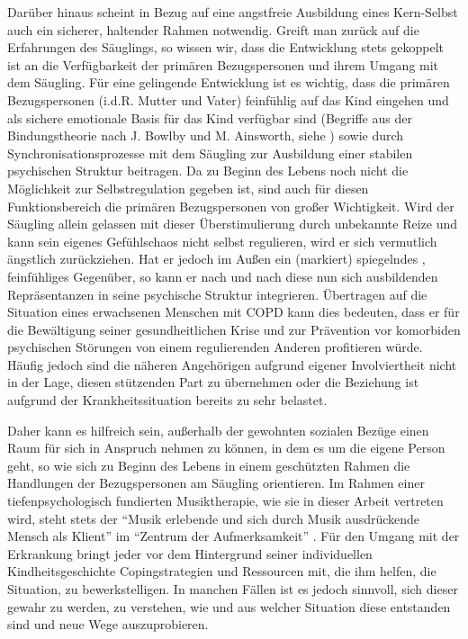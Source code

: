 Darüber hinaus scheint in Bezug auf eine angstfreie Ausbildung eines Kern-Selbst auch ein sicherer, haltender Rahmen notwendig. Greift man zurück auf die Erfahrungen des Säuglings, so wissen wir, dass die Entwicklung stets gekoppelt ist an die Verfügbarkeit der primären Bezugspersonen und ihrem Umgang mit dem Säugling. Für eine gelingende Entwicklung ist es wichtig, dass die primären Bezugspersonen (i.d.R. Mutter und Vater) feinfühlig auf das Kind eingehen und als sichere emotionale Basis für das Kind verfügbar sind (Begriffe aus der Bindungstheorie nach J. Bowlby und M. Ainsworth, siehe \cite{brisch2013}) sowie durch Synchronisationsprozesse mit dem Säugling zur Ausbildung einer stabilen psychischen Struktur beitragen. Da zu Beginn des Lebens noch nicht die Möglichkeit zur Selbstregulation gegeben ist, sind auch für diesen Funktionsbereich die primären Bezugspersonen von großer Wichtigkeit. Wird der Säugling allein gelassen mit dieser Überstimulierung durch unbekannte Reize und kann sein eigenes Gefühlschaos nicht selbst regulieren, wird er sich vermutlich ängstlich zurückziehen. Hat er jedoch im Außen ein (markiert) spiegelndes \autocite[vgl.][153]{fonagy2004}, feinfühliges Gegenüber, so kann er nach und nach diese nun sich ausbildenden Repräsentanzen in seine psychische Struktur integrieren. 
Übertragen auf die Situation eines erwachsenen Menschen mit COPD kann dies bedeuten, dass er für die Bewältigung seiner gesundheitlichen Krise und zur Prävention vor komorbiden psychischen Störungen von einem regulierenden Anderen profitieren würde. Häufig jedoch sind die näheren Angehörigen aufgrund eigener Involviertheit nicht in der Lage, diesen stützenden Part zu übernehmen oder die Beziehung ist aufgrund der Krankheitssituation bereits zu sehr belastet. 

Daher kann es hilfreich sein, außerhalb der gewohnten sozialen Bezüge einen Raum für sich in Anspruch nehmen zu können, in dem es um die eigene Person geht, so wie sich zu Beginn des Lebens in einem geschützten Rahmen die Handlungen der Bezugspersonen am Säugling orientieren. Im Rahmen einer tiefenpsychologisch fundierten Musiktherapie, wie sie in dieser Arbeit vertreten wird, steht stets der "`Musik erlebende und sich durch Musik ausdrückende Mensch als Klient"' im "`Zentrum der Aufmerksamkeit"' \autocite[4]{timmermann2004}. Für den Umgang mit der Erkrankung bringt jeder vor dem Hintergrund seiner individuellen Kindheitsgeschichte Copingstrategien und Ressourcen mit, die ihm helfen, die Situation, zu bewerkstelligen. In manchen Fällen ist es jedoch sinnvoll, sich dieser gewahr zu werden, zu verstehen, wie und aus welcher Situation diese entstanden sind und neue Wege auszuprobieren. 


